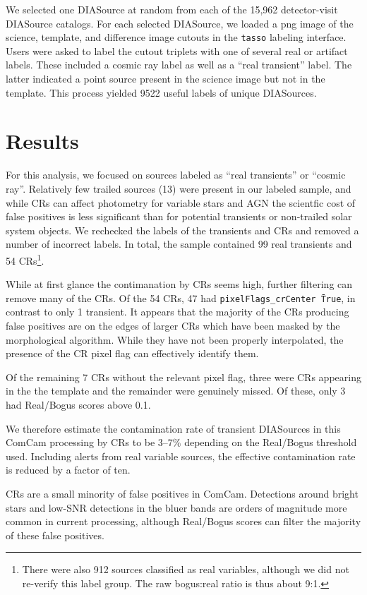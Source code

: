 \documentclass[DM,lsstdraft,authoryear,toc]{lsstdoc}
\begin{document}
We selected one DIASource at random from each of the 15,962 detector-visit DIASource catalogs.
For each selected DIASource, we loaded a png image of the science, template, and difference image cutouts in the \texttt{tasso} labeling interface.
Users were asked to label the cutout triplets with one of several real or artifact labels.
These included a cosmic ray label as well as a ``real transient'' label.
The latter indicated a point source present in the science image but not in the template.
This process yielded 9522 useful labels of unique DIASources.

\section{Results} \label{sec:results}

For this analysis, we focused on sources labeled as ``real transients'' or ``cosmic ray''.
Relatively few trailed sources (13) were present in our labeled sample, and while CRs can affect photometry for variable stars and AGN the scientfic cost of false positives is less significant than for potential transients or non-trailed solar system objects.
We rechecked the labels of the transients and CRs and removed a number of incorrect labels.
In total, the sample contained 99 real transients and 54 CRs\footnote{There were also 912 sources classified as real variables, although we did not re-verify this label group.  
The raw bogus:real ratio is thus about 9:1.}.

While at first glance the contimanation by CRs seems high, further filtering can remove many of the CRs.
Of the 54 CRs, 47 had \texttt{pixelFlags_crCenter \= True}, in contrast to only 1 transient.
It appears that the majority of the CRs producing false positives are on the edges of larger CRs which have been masked by the morphological algorithm.
While they have not been properly interpolated, the presence of the CR pixel flag can effectively identify them.

Of the remaining 7 CRs without the relevant pixel flag, three were CRs appearing in the the template and the remainder were genuinely missed.
Of these, only 3 had Real/Bogus scores above 0.1.

We therefore estimate the contamination rate of transient DIASources in this ComCam processing by CRs to be 3--7\% depending on the Real/Bogus threshold used.
Including alerts from real variable sources, the effective contamination rate is reduced by a factor of ten.

CRs are a small minority of false positives in ComCam.
Detections around bright stars and low-SNR detections in the bluer bands are orders of magnitude more common in current processing, although Real/Bogus scores can filter the majority of these false positives.
\end{document}
